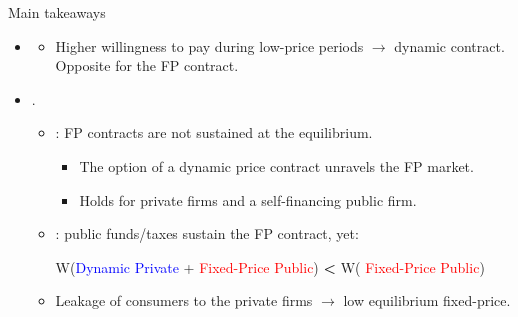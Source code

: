 \documentclass{class}
\begin{document}

\begin{frame}{Main takeaways}


\begin{itemize}

\item {} \vfill

\begin{itemize}
    \item Higher willingness to pay during low-price periods $\rightarrow$ dynamic contract. Opposite for the FP contract.
\end{itemize}

\vfill

\item {}.

\vfill

\begin{itemize}
    \item {}: FP contracts are not sustained at the equilibrium.     \vfill
    \begin{itemize}
    \item The option of a dynamic price contract unravels the FP market.  \vfill
    \item Holds for private firms and a self-financing public firm.
    \end{itemize}
    \vfill

\item {}: public funds/taxes sustain the FP contract, yet: \vfill

    \begin{center}
    W(\textcolor{blue}{Dynamic Private} +  \textcolor{red}{Fixed-Price Public})  { \textbf{  < }} W( \textcolor{red}{Fixed-Price Public})
   \end{center}
\vfill

\item Leakage of consumers to the private firms $\rightarrow$ low equilibrium fixed-price.

    \end{itemize}

\end{itemize}

\end{frame}
\end{document}

